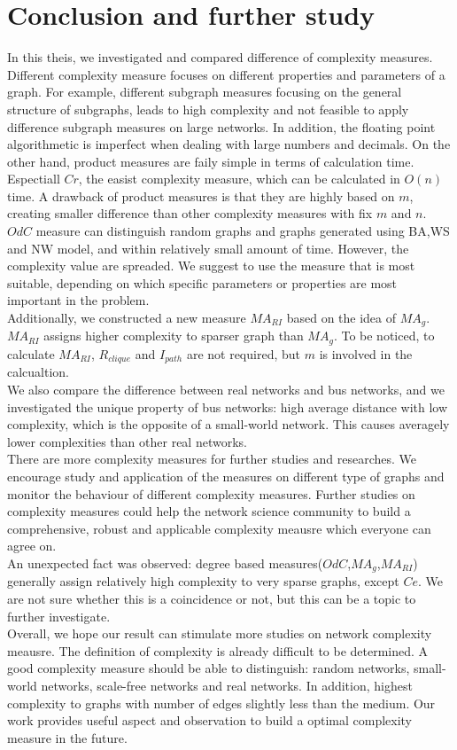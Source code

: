 \documentclass[12pt]{article}
\begin{document}
{\section{Conclusion and further study}
In this theis, we investigated and compared difference of complexity measures. Different complexity measure focuses on different properties and parameters of a graph. For example, different subgraph measures focusing on the general structure of subgraphs, leads to high complexity and not feasible to apply difference subgraph measures on large networks. In addition, the floating point algorithmetic is imperfect when dealing with large numbers and decimals.
On the other hand, product measures are faily simple in terms of calculation time. Espectiall $Cr$, the easist complexity measure, which can be calculated in $O(n)$ time\cite{KIM20082637}. A drawback of product measures is that they are highly based on $m$, creating smaller difference than other complexity measures with fix $m$ and $n$.
$OdC$ measure can distinguish random graphs and graphs generated using BA,WS and NW model, and within relatively small amount of time. However, the complexity value are spreaded. We suggest to use the measure that is most suitable, depending on which specific parameters or properties are most important in the problem.\\
\newline
Additionally, we constructed a new measure $MA_{RI}$ based on the idea of $MA_g$. $MA_{RI}$ assigns higher complexity to sparser graph than $MA_g$. To be noticed, to calculate $MA_{RI}$, $R_{clique}$ and $I_{path}$ are not required, but $m$ is involved in the calcualtion.\\
We also compare the difference between real networks and bus networks, and we investigated the unique property of bus networks: high average distance with low complexity, which is the opposite of a small-world network. This causes averagely lower complexities than other real networks.\\
There are more complexity measures \cite{emmert-streib_dehmer_2012}\cite{dehmer_barbarini_varmuza_graber_2009} for further studies and researches. We encourage study and application of the measures on different type of graphs and monitor the behaviour of different complexity measures. Further studies on complexity measures could help the network science community to build a comprehensive, robust and applicable complexity meausre which everyone can agree on.\\
An unexpected fact was observed: degree based measures($OdC$,$MA_g$,$MA_{RI}$) generally assign relatively high complexity to very sparse graphs, except $Ce$. We are not sure whether this is a coincidence or not, but this can be a topic to further investigate.\\
Overall, we hope our result can stimulate more studies on network complexity meausre. The definition of complexity is already difficult to be determined. A good complexity measure should be able to distinguish: random networks, small-world networks, scale-free networks and real networks. In addition, highest complexity to graphs with number of edges slightly less than the medium. Our work provides useful aspect and observation to build a optimal complexity measure in the future.

}
\end{document}

